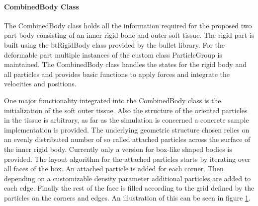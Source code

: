 \paragraph{CombinedBody Class}
The CombinedBody class holds all the information required for the proposed two part body consisting of an inner rigid bone and outer soft tissue. The rigid part is built using the btRigidBody class provided by the bullet library. For the deformable part multiple instances of the custom class ParticleGroup is maintained. The CombinedBody class handles the states for the rigid body and all particles and provides basic functions to apply forces and integrate the velocities and positions.

One major functionality integrated into the CombinedBody class is the initialization of the soft outer tissue. Also the structure of the oriented particles in the tissue is arbitrary, as far as the simulation is concerned a concrete sample implementation is provided. The underlying geometric structure chosen relies on an evenly distributed number of so called attached particles across the surface of the inner rigid body. Currently only a version for box-like shaped bodies is provided. The layout algorithm for the attached particles starts by iterating over all faces of the box. An attached particle is added for each corner. Then depending on a customizable density parameter additional particles are added to each edge. Finally the rest of the face is filled according to the grid defined by the particles on the corners and edges. An illustration of this can be seen in figure \ref{fig:combined_body_density}.

\begin{figure}[htb]
  \centering
\hspace{2cm}
  \label{fig:combined_body_density}
\end{figure}

